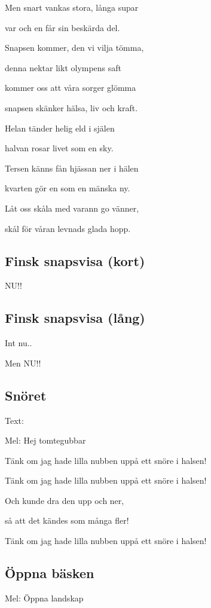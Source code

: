 Men snart vankas stora, långa supar

var och en får sin beskärda del.

Snapsen kommer, den vi vilja tömma,

denna nektar likt olympens saft

kommer oss att våra sorger glömma

snapsen skänker hälsa, liv och kraft.\bigskip

Helan tänder helig eld i själen

halvan rosar livet som en sky.

Tersen känns fån hjässan ner i hälen

kvarten gör en som en mänska ny.

Låt oss skåla med varann go vänner,

skål för våran levnads glada hopp. 


\subsection{\textbf{Finsk snapsvisa (kort)}}

NU!!

\subsection{\textbf{Finsk snapsvisa (lång)}}

Int nu..\bigskip

Men NU!!

\subsection{\textbf{Snöret}}

Text: 

Mel: Hej tomtegubbar\bigskip

Tänk om jag hade lilla nubben uppå ett snöre i halsen!

Tänk om jag hade lilla nubben uppå ett snöre i halsen!

Och kunde dra den upp och ner,

så att det kändes som många fler!

Tänk om jag hade lilla nubben uppå ett snöre i halsen!

\subsection{\textbf{Öppna bäsken}}

Mel: Öppna landskap\bigskip

